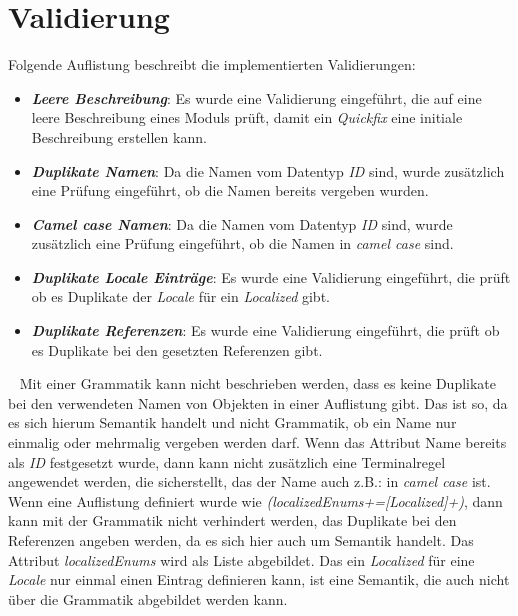 \section{Validierung}
Folgende Auflistung beschreibt die implementierten Validierungen:
\begin{itemize}
	\item\textbf{\emph{Leere Beschreibung}}: Es wurde eine Validierung eingeführt, die auf eine leere Beschreibung eines Moduls prüft, damit ein \emph{Quickfix} eine initiale Beschreibung erstellen kann.
	
	\item\textbf{\emph{Duplikate Namen}}: Da die Namen vom Datentyp \emph{ID} sind, wurde zusätzlich eine Prüfung eingeführt, ob die Namen bereits vergeben wurden.
	
	\item\textbf{\emph{Camel case Namen}}: Da die Namen vom Datentyp \emph{ID} sind, wurde zusätzlich eine Prüfung eingeführt, ob die Namen in \emph{camel case} sind.
	
	\item\textbf{\emph{Duplikate Locale Einträge}}: Es wurde eine Validierung eingeführt, die prüft ob es Duplikate der \emph{Locale} für ein \emph{Localized} gibt. 
	
	\item\textbf{\emph{Duplikate Referenzen}}: Es wurde eine Validierung eingeführt, die prüft ob es Duplikate bei den gesetzten Referenzen gibt.
\end{itemize}
\ \newline
Mit einer Grammatik kann nicht beschrieben werden, dass es keine Duplikate bei den verwendeten Namen von Objekten in einer Auflistung gibt. Das ist so, da es sich hierum Semantik handelt und nicht Grammatik, ob ein Name nur einmalig oder mehrmalig vergeben werden darf.
\newline
\newline
Wenn das Attribut Name bereits als \emph{ID} festgesetzt wurde, dann kann nicht zusätzlich eine Terminalregel angewendet werden, die sicherstellt, das der Name auch z.B.: in \emph{camel case} ist. 
\newline
\newline
Wenn eine Auflistung definiert wurde wie \emph{(localizedEnums+=[Localized]+)}, dann kann mit der Grammatik nicht verhindert werden, das Duplikate bei den Referenzen angeben werden, da es sich hier auch um Semantik handelt. Das Attribut \emph{localizedEnums} wird als Liste abgebildet.
\newline
\newline
Das ein \emph{Localized} für eine \emph{Locale} nur einmal einen Eintrag definieren kann, ist eine Semantik, die auch nicht über die Grammatik abgebildet werden kann.